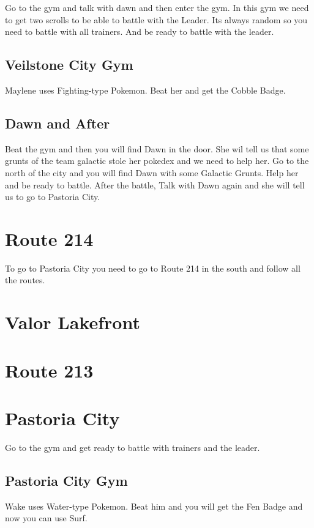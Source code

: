 \documentclass[11pt]{article}
\begin{document}
Go to the gym and talk with dawn and then enter the gym.
In this gym we need to get two scrolls to be able to battle with the Leader.
Its always random so you need to battle with all trainers.
And be ready to battle with the leader.

\subsection{Veilstone City Gym}\label{subsec:veilstone-city-gym}
Maylene uses Fighting-type Pokemon.
Beat her and get the Cobble Badge.

\subsection{Dawn and After}\label{subsec:dawn-and-after}
Beat the gym and then you will find Dawn in the door.
She wil tell us that some grunts of the team galactic stole her pokedex and we need to help her.
Go to the north of the city and you will find Dawn with some Galactic Grunts.
Help her and be ready to battle.
After the battle, Talk with Dawn again and she will tell us to go to Pastoria City.

\section{Route 214}\label{sec:Route_214}

To go to Pastoria City you need to go to Route 214 in the south and follow all the routes.



\section{Valor Lakefront}\label{sec:Valor_Lakefront}


\section{Route 213}\label{sec:Route_213}


\section{Pastoria City}\label{sec:pastoria-city}
Go to the gym and get ready to battle with trainers and the leader.

\subsection{Pastoria City Gym}\label{subsec:pastoria-city-gym}
Wake uses Water-type Pokemon.
Beat him and you will get the Fen Badge and now you can use Surf.
\end{document}
